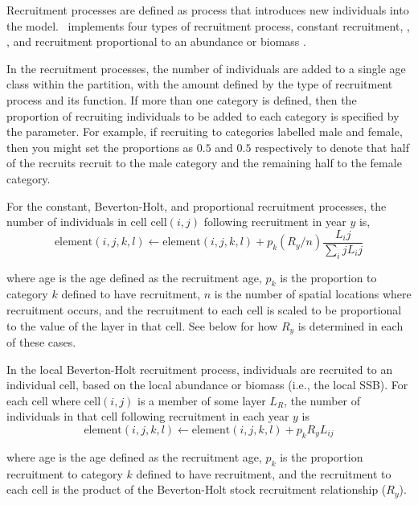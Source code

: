 Recruitment processes are defined as  process that introduces new individuals into the model. \SPM\ implements four types of recruitment process, constant recruitment,   \citep{1203}, , and recruitment proportional to an abundance or biomass .

In the recruitment processes, the number of individuals are added to a single age class within the partition, with the amount defined by the type of recruitment process and its function. If more than one category is defined, then the proportion of recruiting individuals to be added to each category is specified by the  parameter. For example, if recruiting to categories labelled male and female, then you might set the proportions as $0.5$ and $0.5$ respectively to denote that half of the recruits recruit to the male category and the remaining half to the female category.

For the constant, Beverton-Holt, and proportional recruitment processes, the  number of individuals in cell cell$(i,j)$ following recruitment in year $y$ is,  
\begin{equation}
  \text{element}(i,j,k,l) \leftarrow \text{element}(i,j,k,l) + p_k(R_y / n) \frac{L_ij}{\sum_ij L_ij}
\end{equation}

where age is the age defined as the recruitment age, $p_k$ is the proportion to category $k$ defined to have recruitment, $n$ is the number of spatial locations where recruitment occurs, and the recruitment to each cell is scaled to be proportional to the value of the layer in that cell. See below for how $R_y$ is determined in each of these cases.

In the local Beverton-Holt recruitment process, individuals are recruited to an individual cell, based on the local abundance or biomass (i.e., the local SSB). For each cell where cell$(i,j)$ is a member of some layer $L_R$, the number of individuals in that cell following recruitment in each year $y$ is 
\begin{equation}
  \text{element}(i,j,k,l) \leftarrow \text{element}(i,j,k,l) + p_k R_y L_{ij}
\end{equation}

where age is the age defined as the recruitment age, $p_k$ is the proportion recruitment to category $k$ defined to have recruitment, and the recruitment to each cell is the product of the Beverton-Holt stock recruitment relationship ($R_y$). 

